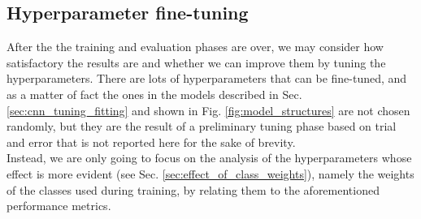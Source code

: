 \subsection{Hyperparameter fine-tuning}
After the the training and evaluation phases are over, we may consider how satisfactory the results are and whether we can improve them by tuning the hyperparameters. There are lots of hyperparameters that can be fine-tuned, and as a matter of fact the ones in the models described in Sec. \ref{sec:cnn_tuning_fitting} and shown in Fig. \ref{fig:model_structures} are not chosen randomly, but they are the result of a preliminary tuning phase based on trial and error that is not reported here for the sake of brevity.
\\Instead, we are only going to focus on the analysis of the hyperparameters whose effect is more evident (see Sec. \ref{sec:effect_of_class_weights}), namely the weights of the classes used during training, by relating them to the aforementioned performance metrics.